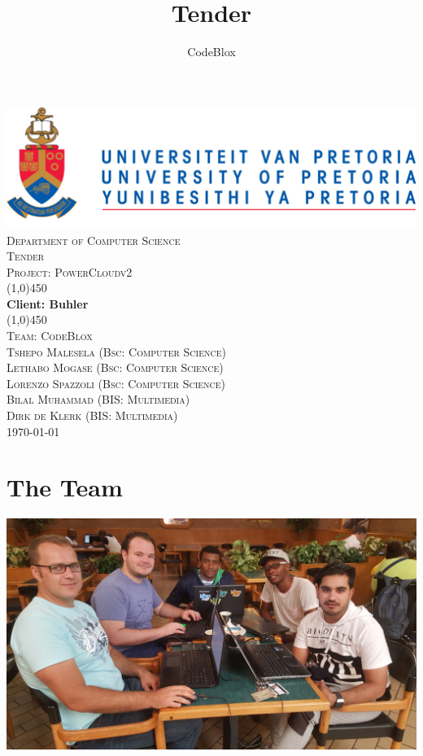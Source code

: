 \documentclass[a4paper,12pt]{article}
\author{CodeBlox}
\title{Tender}
\begin{document}
	\setlength{\parskip}{6pt}
	
	\begin{titlepage}
		\begin{center}
			\includegraphics[width=1\textwidth]{./Pictures/up_logo.png}\\[1.5cm] 
			\textsc{\LARGE Department of Computer Science} \\ [.5cm]
			\textsc{\Large Tender} \\ [.5cm]
			\textsc{\Large Project: PowerCloudv2} \\ [.5cm]
			\line(1,0){450}\\[.5cm]
			\huge{\bfseries Client: Buhler}\\
			\line(1,0){450}\\[.5cm]
			\textsc{\LARGE Team: CodeBlox}\\ [0.5cm]
			
			
			\textsc{\large Tshepo Malesela (Bsc: Computer Science)}\\
			\textsc{\large Lethabo Mogase (Bsc: Computer Science)}\\
			\textsc{\large Lorenzo Spazzoli (Bsc: Computer Science)}\\
			\textsc{\large Bilal Muhammad (BIS: Multimedia)}\\
			\textsc{\large Dirk de Klerk (BIS: Multimedia)}\\ [3.9cm]
			
			\large\today
		\end{center}
	\end{titlepage}
	
	\tableofcontents
	\thispagestyle{empty}
	\footnotesize
	\normalsize
	
	
	
	
	\newpage
	\section{The Team}
	
	\includegraphics[width=1\textwidth]{./Pictures/the_group.jpg}\\
	
\end{document}
